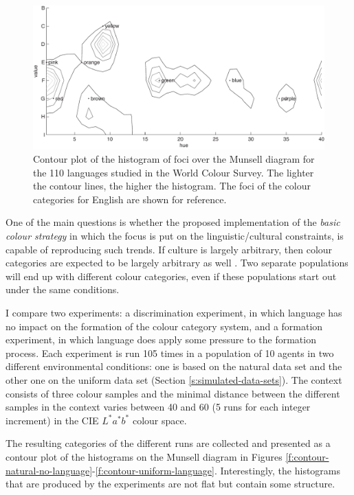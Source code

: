\begin{figure}[htbp]
\centering
  \includegraphics[width=.85\textwidth]{./experiments/figures/contour-wcs}
  \caption[Contour plot of the World Colour Survey]{Contour plot of
    the histogram of foci over the Munsell diagram for the 110
    languages studied in the World Colour Survey. The lighter the
    contour lines, the higher the histogram. The foci of the colour
    categories for English are shown for reference.}
\label{f:contour-wcs}
\end{figure}

One of the main questions is whether the proposed implementation of
the \emph{basic colour strategy} in which the focus is put on the
linguistic/cultural constraints, is capable of reproducing such
trends. If culture is largely arbitrary, then colour categories are
expected to be largely arbitrary as well \citep{roberson05color}. Two
separate populations will end up with different colour categories,
even if these populations start out under the same conditions.

I compare two experiments: a discrimination experiment, in which
language has no impact on the formation of the colour category system,
and a formation experiment, in which language does apply some pressure
to the formation process. Each experiment is run 105 times in a
population of 10 agents in two different environmental conditions: one
is based on the natural data set and the other one on the uniform data
set (Section \ref{s:simulated-data-sets}). The context consists of
three colour samples and the minimal distance between the different
samples in the context varies between 40 and 60 (5 runs for each
integer increment) in the CIE $L^*a^*b^*$ colour space.

The resulting categories of the different runs are collected and
presented as a contour plot of the histograms on the Munsell diagram
in Figures
\ref{f:contour-natural-no-language}-\ref{f:contour-uniform-language}.
Interestingly, the histograms that are produced by the experiments are
not flat but contain some structure.

